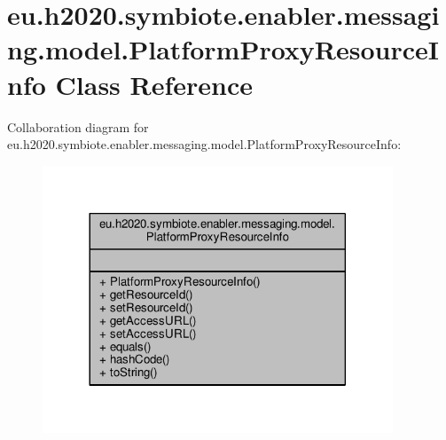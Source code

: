 \hypertarget{classeu_1_1h2020_1_1symbiote_1_1enabler_1_1messaging_1_1model_1_1PlatformProxyResourceInfo}{}\section{eu.\+h2020.\+symbiote.\+enabler.\+messaging.\+model.\+Platform\+Proxy\+Resource\+Info Class Reference}
\label{classeu_1_1h2020_1_1symbiote_1_1enabler_1_1messaging_1_1model_1_1PlatformProxyResourceInfo}


Collaboration diagram for eu.\+h2020.\+symbiote.\+enabler.\+messaging.\+model.\+Platform\+Proxy\+Resource\+Info\+:
\nopagebreak
\begin{figure}[H]
\begin{center}
\leavevmode
\includegraphics[width=296pt]{classeu_1_1h2020_1_1symbiote_1_1enabler_1_1messaging_1_1model_1_1PlatformProxyResourceInfo__coll__graph}
\end{center}
\end{figure}
